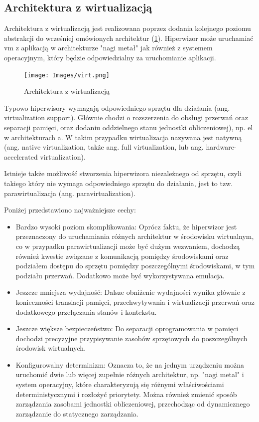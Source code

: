 \documentclass[../../main]{subfiles}
\begin{document}
\subsection{Architektura z wirtualizacją}

Architektura z wirtualizacją jest realizowana poprzez dodania kolejnego poziomu abstrakcji do wcześniej omówionych architektur (\cref{fig:virt}). Hiperwizor może uruchamiać \gls{vm} z aplikacją w architekturze "nagi metał" jak również z systemem operacyjnym, który będzie odpowiedzialny za uruchomianie aplikacji.

\begin{figure}[h]
    \centering
    \texttt{[image: Images/virt.png]}
    \caption{Architektura z wirtualizacją}
    \label{fig:virt}
\end{figure}

Typowo hiperwisory wymagają odpowiedniego sprzętu dla działania (ang. virtualization support). Głównie chodzi o rozszerzenia do obsługi przerwań oraz separacji pamięci, oraz dodaniu  oddzielnego stanu jednostki obliczeniowej), np. \gls{el} w architekturach \gls{a}. W takim przypadku wirtualizacja nazywana jest natywną (ang. native virtualization, także ang. full virtualization, lub ang. hardware-accelerated virtualization).

Istnieje także możliwość stworzenia hiperwizora niezależnego od sprzętu, czyli takiego który nie wymaga odpowiedniego sprzętu do działania, jest to tzw. parawirtualizacja (ang. paravirtualization).

Poniżej przedstawiono najważniejsze cechy:
\begin{itemize}
    \item Bardzo wysoki poziom skomplikowania: Oprócz faktu, że hiperwizor jest przeznaczony do uruchamiania różnych architektur w środowisku wirtualnym, co w przypadku parawirtualizacji może być dużym wezwaniem, dochodzą również kwestie związane z komunikacją pomiędzy środowiskami oraz podziałem dostępu do sprzętu pomiędzy poszczególnymi środowiskami, w tym podziału przerwań. Dodatkowo może być wykorzystywana emulacja.
    \item Jeszcze mniejsza wydajność: Dalsze obniżenie wydajności wynika głównie z konieczności translacji pamięci, przechwytywania i wirtualizacji przerwań oraz dodatkowego przełączania stanów i kontekstu.
    \item Jeszcze większe bezpieczeństwo: Do separacji oprogramowania w pamięci dochodzi precyzyjne przypisywanie zasobów sprzętowych do poszczególnych środowisk wirtualnych.
    \item Konfigurowalny determinizm: Oznacza to, że na jednym urządzeniu można uruchomić dwie lub więcej zupełnie różnych architektur, np. "nagi metal" i system operacyjny, które charakteryzują się różnymi właściwościami deterministycznymi i rozłożyć priorytety. Można również zmienić sposób zarządzania zasobami jednostki obliczeniowej, przechodząc od dynamicznego zarządzanie do statycznego zarządzania.
\end{itemize}
\end{document}
